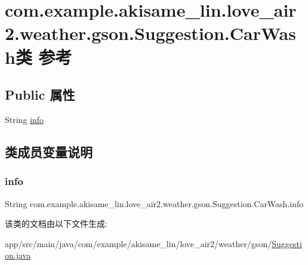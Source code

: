 \hypertarget{classcom_1_1example_1_1akisame__lin_1_1love__air2_1_1weather_1_1gson_1_1_suggestion_1_1_car_wash}{}\section{com.\+example.\+akisame\+\_\+lin.\+love\+\_\+air2.\+weather.\+gson.\+Suggestion.\+Car\+Wash类 参考}
\label{classcom_1_1example_1_1akisame__lin_1_1love__air2_1_1weather_1_1gson_1_1_suggestion_1_1_car_wash}
\subsection*{Public 属性}
\begin{DoxyCompactItemize}
\item 
String \mbox{\hyperlink{classcom_1_1example_1_1akisame__lin_1_1love__air2_1_1weather_1_1gson_1_1_suggestion_1_1_car_wash_a6d620dda5f88bdfdbd78e468c02db7b8}{info}}
\end{DoxyCompactItemize}


\subsection{类成员变量说明}
\mbox{\label{classcom_1_1example_1_1akisame__lin_1_1love__air2_1_1weather_1_1gson_1_1_suggestion_1_1_car_wash_a6d620dda5f88bdfdbd78e468c02db7b8}} 
\subsubsection{\texorpdfstring{info}{info}}
{\footnotesize\ttfamily String com.\+example.\+akisame\+\_\+lin.\+love\+\_\+air2.\+weather.\+gson.\+Suggestion.\+Car\+Wash.\+info}



该类的文档由以下文件生成\+:\begin{DoxyCompactItemize}
\item 
app/src/main/java/com/example/akisame\+\_\+lin/love\+\_\+air2/weather/gson/\mbox{\hyperlink{java_2com_2example_2akisame__lin_2love__air2_2weather_2gson_2_suggestion_8java}{Suggestion.\+java}}\end{DoxyCompactItemize}
